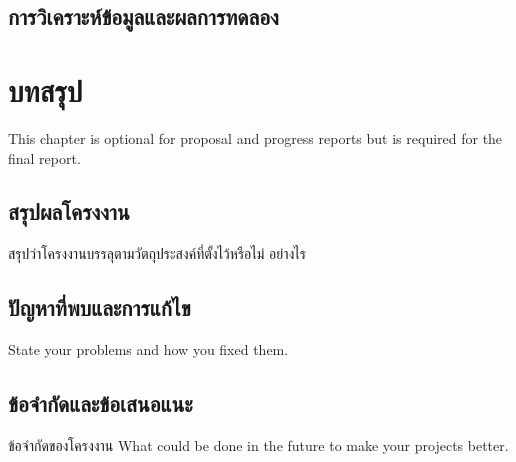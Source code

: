 \documentclass[12pt,oneside,openright,a4paper]{explo-thai-project}
\begin{document}
\section{การวิเคราะห์ข้อมูลและผลการทดลอง}


\chapter{บทสรุป}

This chapter is optional for proposal and progress reports but 
is required for the final report.

\section{สรุปผลโครงงาน}
สรุปว่าโครงงานบรรลุตามวัตถุประสงค์ที่ตั้งไว้หรือไม่ อย่างไร 

\section{ปัญหาที่พบและการแก้ไข}
State your problems and how you fixed them.

\section{ข้อจำกัดและข้อเสนอแนะ}
ข้อจำกัดของโครงงาน What could be done in the future to make your projects better.


\end{document}
